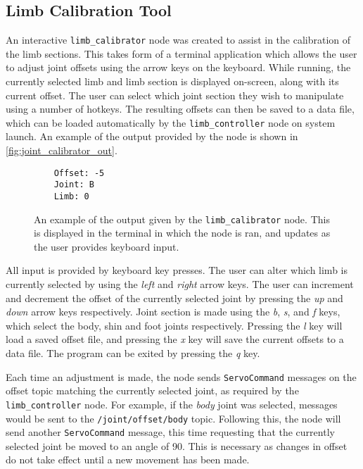 \subsection{Limb Calibration Tool}

An interactive \texttt{limb\_calibrator} node was created to assist in the calibration of the limb sections. This takes form of a terminal application which allows the user to adjust joint offsets using the arrow keys on the keyboard. While running, the currently selected limb and limb section is displayed on-screen, along with its current offset. The user can select which joint section they wish to manipulate using a number of hotkeys. The resulting offsets can then be saved to a data file, which can be loaded automatically by the \texttt{limb\_controller} node on system launch. An example of the output provided by the node is shown in \autoref{fig:joint_calibrator_out}.

\begin{figure}[!h]
    \centering
	\begin{lstlisting}
	Offset: -5
	Joint: B
	Limb: 0
	\end{lstlisting}
	\caption{An example of the output given by the \texttt{limb\_calibrator} node. This is displayed in the terminal in which the node is ran, and updates as the user provides keyboard input.}
	\label{fig:joint_calibrator_out}
\end{figure}

All input is provided by keyboard key presses. The user can alter which limb is currently selected  by using the \emph{left} and \emph{right} arrow keys. The user can increment and decrement the offset of the currently selected joint by pressing the \emph{up} and \emph{down} arrow keys respectively. Joint section is made using the \emph{b}, \emph{s}, and \emph{f} keys, which select the body, shin and foot joints respectively. Pressing the \emph{l} key will load a saved offset file, and pressing the \emph{x} key will save the current offsets to a data file. The program can be exited by pressing the \emph{q} key.

Each time an adjustment is made, the node sends \texttt{ServoCommand} messages on the offset topic matching the currently selected joint, as required by the \texttt{limb\_controller} node. For example, if the \emph{body} joint was selected, messages would be sent to the \texttt{/joint/offset/body} topic. Following this, the node will send another \texttt{ServoCommand} message, this time requesting that the currently selected joint be moved to an angle of 90\textdegree{}. This is necessary as changes in offset do not take effect until a new movement has been made.

